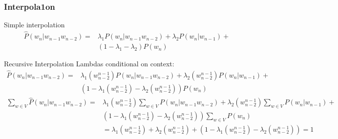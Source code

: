 \documentclass{beamer}
\begin{document}
\begin{frame}\frametitle{Interpola1on}

\begin{block}{Simple interpolation}
\vspace{-15pt}
\begin{align*}
\hat{P}(w_n|w_{n-1}w_{n-2})= & \lambda_1 P(w_n|w_{n-1}w_{n-2}) + \lambda_2 P(w_n|w_{n-1}) + \\
& (1-\lambda_1 - \lambda_2) P(w_n) 
\end{align*}
\end{block}

\begin{block}{Recursive Interpolation}
Lambdas conditional on context:
\vspace{-5pt}
\begin{align*}
\hat{P}(w_n|w_{n-1}w_{n-2})= & \lambda_1(w_{n-2}^{n-1}) P(w_n|w_{n-1}w_{n-2}) + \lambda_2(w_{n-2}^{n-1}) P(w_n|w_{n-1}) + \\
& (1-\lambda_1(w_{n-2}^{n-1}) - \lambda_2(w_{n-2}^{n-1})) P(w_n) 
\end{align*}
\vspace{-10pt}
{\footnotesize
\begin{align*}
\sum_{w\in V}\hat{P}(w_n|w_{n-1}w_{n-2})= &
\lambda_1(w_{n-2}^{n-1}) \sum_{w\in V}  P(w_n|w_{n-1}w_{n-2}) + \lambda_2(w_{n-2}^{n-1})\sum_{w\in V}  P(w_n|w_{n-1}) + \\
& (1-\lambda_1(w_{n-2}^{n-1}) -
\lambda_2(w_{n-2}^{n-1})) \sum_{w\in V} P(w_n)\\
& =  \lambda_1(w_{n-2}^{n-1}) + \lambda_2(w_{n-2}^{n-1}) + (1-\lambda_1(w_{n-2}^{n-1}) -
\lambda_2(w_{n-2}^{n-1})) = 1
\end{align*}
}%
\end{block}


\end{frame}
\end{document}

